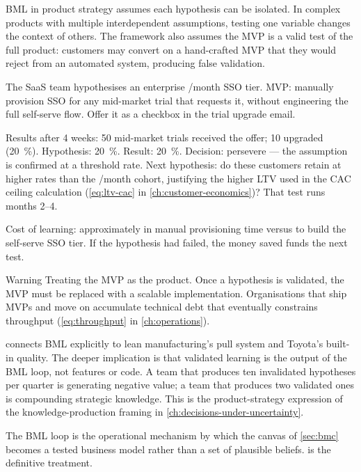 BML in product strategy assumes each hypothesis can be isolated. In complex products with multiple interdependent assumptions, testing one variable changes the context of others. The framework also assumes the MVP is a valid test of the full product: customers may convert on a hand-crafted MVP that they would reject from an automated system, producing false validation.

\begin{example}
The SaaS team hypothesises an enterprise /month SSO tier. MVP: manually provision SSO for any mid-market trial that requests it, without engineering the full self-serve flow. Offer it as a checkbox in the trial upgrade email.

Results after 4 weeks: \num{50} mid-market trials received the offer; \num{10} upgraded (\qty{20}{\percent}). Hypothesis: \qty{20}{\percent}. Result: \qty{20}{\percent}. Decision: persevere --- the assumption is confirmed at a threshold rate. Next hypothesis: do these customers retain at higher rates than the /month cohort, justifying the higher LTV used in the CAC ceiling calculation (\cref{eq:ltv-cac} in \cref{ch:customer-economics})? That test runs months 2--4.

Cost of learning: approximately  in manual provisioning time versus  to build the self-serve SSO tier. If the hypothesis had failed, the money saved funds the next test.
\end{example}

\begin{admonition}{Warning}
Treating the MVP as the product. Once a hypothesis is validated, the MVP must be replaced with a scalable implementation. Organisations that ship MVPs and move on accumulate technical debt that eventually constrains throughput (\cref{eq:throughput} in \cref{ch:operations}).
\end{admonition}

\textcite{ries2011} connects BML explicitly to lean manufacturing's pull system and Toyota's built-in quality. The deeper implication is that validated learning is the output of the BML loop, not features or code. A team that produces ten invalidated hypotheses per quarter is generating negative value; a team that produces two validated ones is compounding strategic knowledge. This is the product-strategy expression of the knowledge-production framing in \cref{ch:decisions-under-uncertainty}.

The BML loop is the operational mechanism by which the canvas of \cref{sec:bmc} becomes a tested business model rather than a set of plausible beliefs. \textcite{ries2011} is the definitive treatment.

